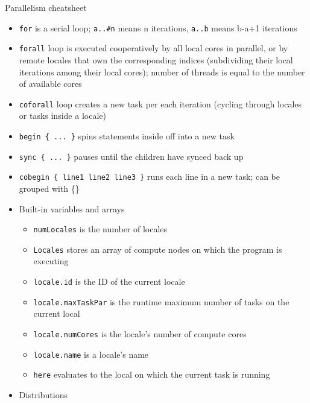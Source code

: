 \documentclass[10pt,xcolor=pdftex,dvipsnames,table]{beamer}
\newcommand{\tc}{\textcolor}
\begin{document}
\begin{frame}{Parallelism cheatsheet}
  {\let\normalsize\footnotesize \normalsize
    \begin{itemize}\setlength{\itemsep}{0.3mm}
    \item \tc{Mahogany}{\texttt{for}} is a serial loop; \quad\tc{Mahogany}{\texttt{a..\#n}} means n
      iterations, \quad\tc{Mahogany}{\texttt{a..b}} means b-a+1 iterations
    \item \tc{Mahogany}{\texttt{forall}} loop is executed cooperatively by all local cores in parallel,
      or by remote locales that own the corresponding indices (subdividing their local iterations among
      their local cores); number of threads is equal to the number of available cores
    \item \tc{Mahogany}{\texttt{coforall}} loop creates a new task per each iteration (cycling through
      locales or tasks inside a locale)
    \item \tc{Mahogany}{\texttt{begin \{ ... \}}} spins statements inside off into a new task
    \item \tc{Mahogany}{\texttt{sync \{ ... \}}} pauses until the children have synced back up
    \item \tc{Mahogany}{\texttt{cobegin \{ line1 line2 line3 \}}} runs each line in a new task; can be
      grouped with \{\}
    \item Built-in variables and arrays
      {\let\small\scriptsize
        \begin{itemize}\setlength{\itemsep}{0.1mm}
        \item \tc{Mahogany}{\texttt{numLocales}} is the number of locales
        \item \tc{Mahogany}{\texttt{Locales}} stores an array of compute nodes on which the program is
          executing
        \item \tc{Mahogany}{\texttt{locale.id}} is the ID of the current locale
        \item \tc{Mahogany}{\texttt{locale.maxTaskPar}} is the runtime maximum number of tasks on the
          current local
        \item \tc{Mahogany}{\texttt{locale.numCores}} is the locale's number of compute cores
        \item \tc{Mahogany}{\texttt{locale.name}} is a locale's name
        \item \tc{Mahogany}{\texttt{here}} evaluates to the local on which the current task is running
        \end{itemize}}
    \item Distributions

\end{itemize}}
\end{frame}
\end{document}
